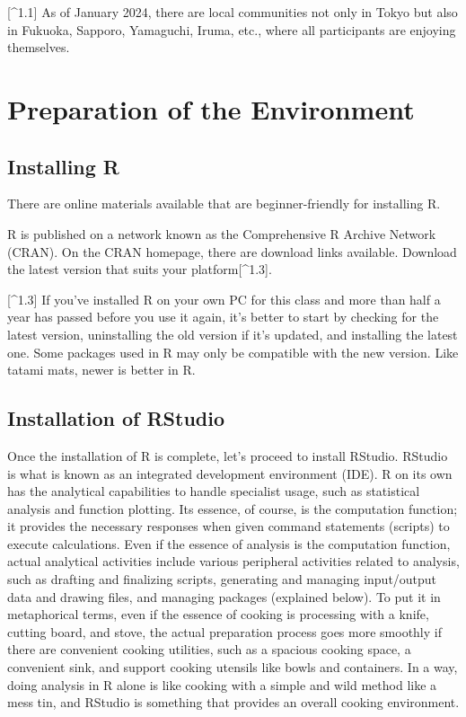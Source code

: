 \documentclass[
  a4paper,
]{book}
\begin{document}
{[}\^{}1.1{]} As of January 2024, there are local communities not only
in Tokyo but also in Fukuoka, Sapporo, Yamaguchi, Iruma, etc., where all
participants are enjoying themselves.

\section{Preparation of the
Environment}\label{preparation-of-the-environment}

\subsection{Installing R}\label{installing-r}

There are online materials available that are beginner-friendly for
installing R.

R is published on a network known as the Comprehensive R Archive Network
(CRAN). On the CRAN homepage, there are download links available.
Download the latest version that suits your platform{[}\^{}1.3{]}.

{[}\^{}1.3{]} If you've installed R on your own PC for this class and
more than half a year has passed before you use it again, it's better to
start by checking for the latest version, uninstalling the old version
if it's updated, and installing the latest one. Some packages used in R
may only be compatible with the new version. Like tatami mats, newer is
better in R.

\subsection{Installation of RStudio}\label{installation-of-rstudio}

Once the installation of R is complete, let's proceed to install
RStudio. RStudio is what is known as an integrated development
environment (IDE). R on its own has the analytical capabilities to
handle specialist usage, such as statistical analysis and function
plotting. Its essence, of course, is the computation function; it
provides the necessary responses when given command statements (scripts)
to execute calculations. Even if the essence of analysis is the
computation function, actual analytical activities include various
peripheral activities related to analysis, such as drafting and
finalizing scripts, generating and managing input/output data and
drawing files, and managing packages (explained below). To put it in
metaphorical terms, even if the essence of cooking is processing with a
knife, cutting board, and stove, the actual preparation process goes
more smoothly if there are convenient cooking utilities, such as a
spacious cooking space, a convenient sink, and support cooking utensils
like bowls and containers. In a way, doing analysis in R alone is like
cooking with a simple and wild method like a mess tin, and RStudio is
something that provides an overall cooking environment.
\end{document}
